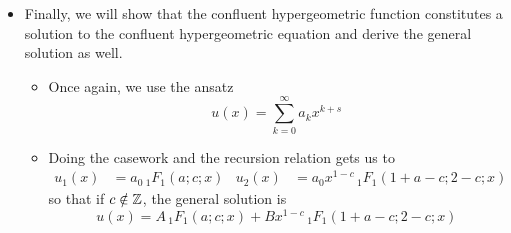 \documentclass[../finalProject.tex]{subfiles}
\begin{document}
\begin{itemize}
\begin{itemize}
\begin{itemize}
        \end{itemize}
    \end{itemize}
    \item Finally, we will show that the confluent hypergeometric function constitutes a solution to the confluent hypergeometric equation and derive the general solution as well.
    \begin{itemize}
        \item Once again, we use the ansatz
        \begin{equation*}
            u(x) = \sum_{k=0}^\infty a_kx^{k+s}
        \end{equation*}
        \item Doing the casework and the recursion relation gets us to
        \begin{align*}
            u_1(x) &= a_0\,{}_1F_1(a;c;x)&
            u_2(x) &= a_0x^{1-c}\,{}_1F_1(1+a-c;2-c;x)
        \end{align*}
        so that if $c\notin\mathbb{Z}$, the general solution is
        \begin{equation*}
            u(x) = A\,{}_1F_1(a;c;x)+Bx^{1-c}\,{}_1F_1(1+a-c;2-c;x)
        \end{equation*}
    \end{itemize}
\end{itemize}
\end{document}

